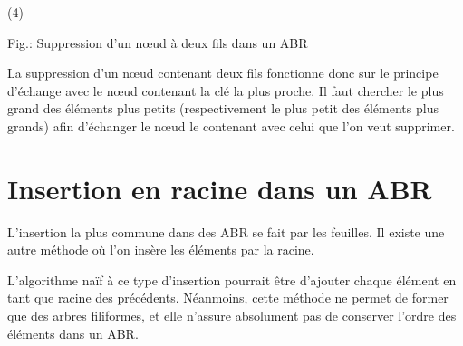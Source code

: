 \documentclass[11pt,a4paper]{article}
\begin{document}
\begin{table}[ht!]
\begin{minipage}{0.45\textwidth}
(4)

  \end{minipage}
\caption{Fig.\thefigure : Suppression d'un nœud à deux fils dans un ABR}
\label{fig:example3-BST-deletion-3-double-child}
\end{table}


La suppression d'un nœud contenant deux fils fonctionne donc sur le principe d'échange avec le nœud contenant la clé la plus proche.
Il faut chercher le plus grand des éléments plus petits (respectivement le plus petit des éléments plus grands) afin d'échanger le nœud le contenant avec celui que l'on veut supprimer.


\bigskip


\section{Insertion en racine dans un ABR}




%
L'insertion la plus commune dans des ABR se fait par les feuilles.
Il existe une autre méthode où l'on insère les éléments par la racine.

L'algorithme naïf à ce type d'insertion pourrait être d'ajouter chaque élément en tant que racine des précédents.
Néanmoins, cette méthode ne permet de former que des arbres filiformes, et elle n'assure absolument pas de conserver l'ordre des éléments dans un ABR.
\end{document}
